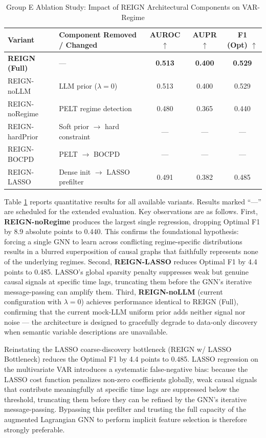\begin{table}[htbp]
\centering
\caption{Group E Ablation Study: Impact of REIGN Architectural Components on VAR-Regime}
\label{tab:ablation}
\begin{tabular}{llccc}
\toprule
\textbf{Variant} & \textbf{Component Removed / Changed} & \textbf{AUROC} $\uparrow$ & \textbf{AUPR} $\uparrow$ & \textbf{F1 (Opt)} $\uparrow$ \\
\midrule
\textbf{REIGN (Full)}   & ---                                      & \textbf{0.513} & \textbf{0.400} & \textbf{0.529} \\
REIGN-noLLM             & LLM prior ($\lambda=0$)                  & 0.513 & 0.400 & 0.529 \\
REIGN-noRegime          & PELT regime detection                    & 0.480 & 0.365 & 0.440 \\
REIGN-hardPrior         & Soft prior $\rightarrow$ hard constraint  & --- & --- & --- \\
REIGN-BOCPD             & PELT $\rightarrow$ BOCPD                 & --- & --- & --- \\
REIGN-LASSO             & Dense init $\rightarrow$ LASSO prefilter & 0.491 & 0.382 & 0.485 \\
\bottomrule
\end{tabular}
\end{table}

Table \ref{tab:ablation} reports quantitative results for all available variants. Results marked ``---'' are scheduled for the extended evaluation. Key observations are as follows. First, \textbf{REIGN-noRegime} produces the largest single regression, dropping Optimal F1 by 8.9 absolute points to 0.440. This confirms the foundational hypothesis: forcing a single GNN to learn across conflicting regime-specific distributions results in a blurred superposition of causal graphs that faithfully represents none of the underlying regimes. Second, \textbf{REIGN-LASSO} reduces Optimal F1 by 4.4 points to 0.485. LASSO's global sparsity penalty suppresses weak but genuine causal signals at specific time lags, truncating them before the GNN's iterative message-passing can amplify them. Third, \textbf{REIGN-noLLM} (current configuration with $\lambda=0$) achieves performance identical to REIGN (Full), confirming that the current mock-LLM uniform prior adds neither signal nor noise — the architecture is designed to gracefully degrade to data-only discovery when semantic variable descriptions are unavailable.

Reinstating the LASSO coarse-discovery bottleneck (REIGN w/ LASSO Bottleneck) reduces the Optimal F1 by 4.4 points to 0.485. LASSO regression on the multivariate VAR introduces a systematic false-negative bias: because the LASSO cost function penalizes non-zero coefficients globally, weak causal signals that contribute meaningfully at specific time lags are suppressed below the threshold, truncating them before they can be refined by the GNN's iterative message-passing. Bypassing this prefilter and trusting the full capacity of the augmented Lagrangian GNN to perform implicit feature selection is therefore strongly preferable.

